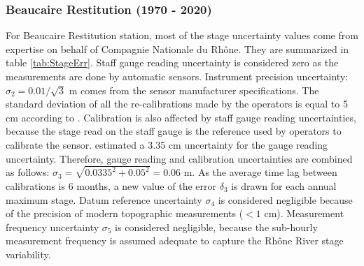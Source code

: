     \subsubsection{Beaucaire Restitution (1970 - 2020)}
    
    For Beaucaire Restitution station, most of the stage uncertainty values come from \citet{cetiat_conference_2005} expertise on behalf of Compagnie Nationale du Rhône. They are summarized in table \ref{tab:StageErr}. Staff gauge reading uncertainty is considered zero as the measurements are done by automatic sensors. Instrument precision uncertainty: $\sigma_2 = 0.01/\sqrt{3}$ m comes from the sensor manufacturer specifications. The standard deviation of all the re-calibrations made by the operators is equal to 5 cm according to \citet{cetiat_conference_2005}. Calibration is also affected by staff gauge reading uncertainties, because the stage read on the staff gauge is the reference used by operators to calibrate the sensor. \citet{cetiat_conference_2005} estimated a 3.35 cm uncertainty for the gauge reading uncertainty. Therefore, gauge reading and calibration uncertainties are combined as follows: $\sigma_3 = \sqrt{0.0335^2 + 0.05^2} = 0.06$ m. As the average time lag between calibrations is 6 months, a new value of the error $\delta_3$ is drawn for each annual maximum stage. Datum reference uncertainty $\sigma_4$ is considered negligible because of the precision of modern topographic measurements ($<1$ cm). Measurement frequency uncertainty $\sigma_5$ is considered negligible, because the sub-hourly measurement frequency is assumed adequate to capture the Rhône River stage variability. 
        
